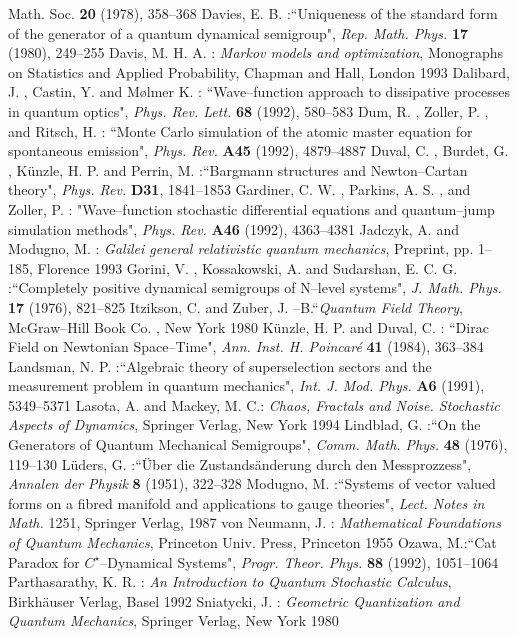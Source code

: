 \documentclass[12pt]{article}
\begin{document}
\begin{thebibliography}{99}
{Math.  Soc. }  {\bf 20} (1978), 358--368
 Davies,  E. B. :``Uniqueness of the standard form of
the generator of a quantum dynamical semigroup", {\em
Rep. Math. Phys. }{\bf 17} (1980), 249--255
 Davis,  M. H. A. : {\em Markov models and optimization}, 
Monographs on Statistics and Applied Probability,  Chapman and Hall,  London 1993 
 Dalibard,  J. ,  Castin,  Y.  and M{\o}lmer K. : 
``Wave--function approach to dissipative processes in quantum optics", 
{\em Phys. Rev. Lett. }{\bf
68} (1992), 580--583
 Dum,  R. ,  Zoller,  P. ,  and Ritsch,  H. : 
``Monte Carlo simulation of the
atomic master equation for spontaneous emission", 
{\em Phys. Rev. }{\bf A45} (1992), 4879--4887
 Duval,  C. ,  Burdet,  G. ,  K\"unzle,  H. P.  and Perrin, 
M. :``Bargmann structures and Newton--Cartan theory", {\em Phys. Rev. }{\bf
D31}, 1841--1853 
 Gardiner,  C. W. ,  Parkins,  A. S. ,  and Zoller,  P. : 
"Wave--function stochastic differential equations and 
quantum--jump simulation methods", {\em Phys. Rev. }{\bf A46} (1992), 4363--4381 
 Jadczyk,  A.  and Modugno,  M. : 
{\em Galilei general relativistic quantum mechanics}, Preprint, pp. 1--185,  
Florence 1993
 Gorini,  V. ,  Kossakowski,  A.  and Sudarshan, 
E. C. G. :``Completely positive dynamical semigroups of N--level
systems",  {\em J.  Math.  Phys. }{\bf 17} (1976), 821--825
 Itzikson,  C.  and Zuber,  J. --B.``{\em Quantum Field
Theory},  McGraw--Hill Book Co. ,  New York 1980
K\"{u}nzle,  H. P.  and Duval,  C. : ``Dirac Field on Newtonian
Space--Time",  {\em Ann.  Inst.  H.  Poincar\'{e} }{\bf 41}
 (1984), 363--384
 Landsman,  N. P. :``Algebraic theory of
superselection sectors and the measurement problem in quantum
mechanics", {\em Int. J. Mod. Phys. }{\bf A6} (1991), 5349--5371 
 Lasota, A. and Mackey, M. C.: {\em Chaos,
Fractals and Noise. Stochastic Aspects of Dynamics}, Springer Verlag,
New York 1994
 Lindblad,  G. :``On the Generators of Quantum Mechanical
Semigroups", {\em Comm. Math. Phys. }{\bf 48} (1976), 119--130
 L\"uders,  G. :``\"Uber die Zustands\"anderung durch den
Messprozzess", {\em Annalen der Physik }{\bf 8} (1951), 322--328
 Modugno,  M. :``Systems of vector valued forms on
a fibred manifold and applications to gauge theories", 
{\em Lect.  Notes in Math. } 1251,  Springer Verlag,  1987
 von Neumann,  J. : {\em Mathematical Foundations of
Quantum Mechanics},  Princeton Univ.  Press,  Princeton 1955
 Ozawa, M.:``Cat Paradox for $C^{\star}$--Dynamical
Systems", {\em Progr. Theor. Phys. }{\bf 88} (1992), 1051--1064
  Parthasarathy,  K. R. : {\em An
Introduction to Quantum Stochastic Calculus},  Birkh\"auser Verlag, 
Basel 1992 
 Sniatycki,  J. : {\em Geometric Quantization and Quantum
Mechanics},  Springer Verlag,  New York 1980

\end{thebibliography}
\end{document}
